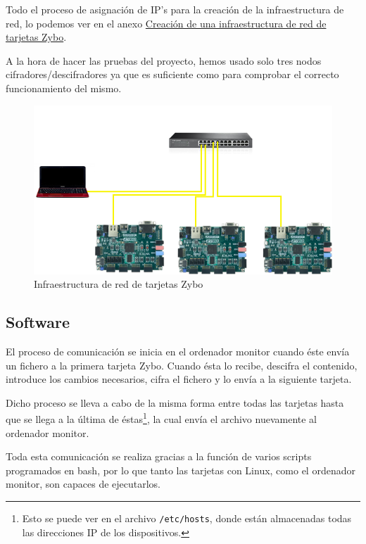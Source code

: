 Todo el proceso de asignación de IP's para la creación de la infraestructura de red, lo podemos ver en el anexo \hyperlink{CreacionInfraestructura}{Creación de una infraestructura de red de tarjetas Zybo}.

A la hora de hacer las pruebas del proyecto, hemos usado solo tres nodos cifradores/descifradores ya que es suficiente como para comprobar el correcto funcionamiento del mismo.

\begin{figure}[h]
	\centering
	\includegraphics[scale=0.5]{Epilogo/RedCompleta.png}
	\caption{Infraestructura de red de tarjetas Zybo}
	\label{Infraestructura de red de tarjetas Zybo}
\end{figure}

\subsection{Software}
El proceso de comunicación se inicia en el ordenador monitor cuando éste envía un fichero a la primera tarjeta Zybo. Cuando ésta lo recibe, descifra el contenido, introduce los cambios necesarios, cifra el fichero y lo envía a la siguiente tarjeta.

Dicho proceso se lleva a cabo de la misma forma entre todas las tarjetas hasta que se llega a la última de éstas\footnote{Esto se puede ver en el archivo \texttt{/etc/hosts}, donde están almacenadas todas las direcciones IP de los dispositivos.}, la cual envía el archivo nuevamente al ordenador monitor.

Toda esta comunicación se realiza gracias a la función de varios scripts programados en bash, por lo que tanto las tarjetas con Linux, como el ordenador monitor, son capaces de ejecutarlos.

